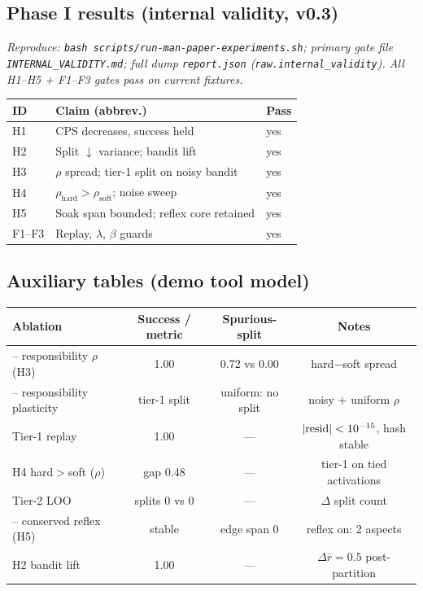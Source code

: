 \documentclass[11pt]{article}
\theoremstyle{definition}
\begin{document}
\subsection{Phase I results (internal validity, v0.3)}
\noindent\emph{Reproduce: \texttt{bash scripts/run-man-paper-experiments.sh};
primary gate file \texttt{INTERNAL\_VALIDITY.md}; full dump
\texttt{report.json} (\texttt{raw.internal\_validity}). All H1--H5 + F1--F3
gates pass on current fixtures.}

\begin{center}
\begin{tabular}{@{}lll@{}}
\toprule
ID & Claim (abbrev.) & Pass \\
\midrule
H1 & CPS decreases, success held & yes \\
H2 & Split $\downarrow$ variance; bandit lift & yes \\
H3 & $\rho$ spread; tier-1 split on noisy bandit & yes \\
H4 & $\rho_\text{hard}>\rho_\text{soft}$; noise sweep & yes \\
H5 & Soak span bounded; reflex core retained & yes \\
F1--F3 & Replay, $\lambda$, $\beta$ guards & yes \\
\bottomrule
\end{tabular}
\end{center}

\subsection{Auxiliary tables (demo tool model)}



\begin{center}
\begin{tabular}{@{}lccc@{}}
\toprule
Ablation & Success / metric & Spurious-split & Notes \\
\midrule
-- responsibility $\rho$ (H3) & 1.00 & 0.72 vs 0.00 & hard$-$soft spread \\
-- responsibility plasticity & tier-1 split & uniform: no split & noisy + uniform $\rho$ \\
Tier-1 replay & 1.00 & --- & $|{\rm resid}|<10^{-15}$, hash stable \\
H4 hard$>$soft ($\rho$) & gap 0.48 & --- & tier-1 on tied activations \\
Tier-2 LOO & splits 0 vs 0 & --- & $\Delta$ split count \\
-- conserved reflex (H5) & stable & edge span 0 & reflex on: 2 aspects \\
H2 bandit lift & 1.00 & --- & $\Delta\bar r = 0.5$ post-partition \\
\bottomrule
\end{tabular}
\end{center}
\end{document}
